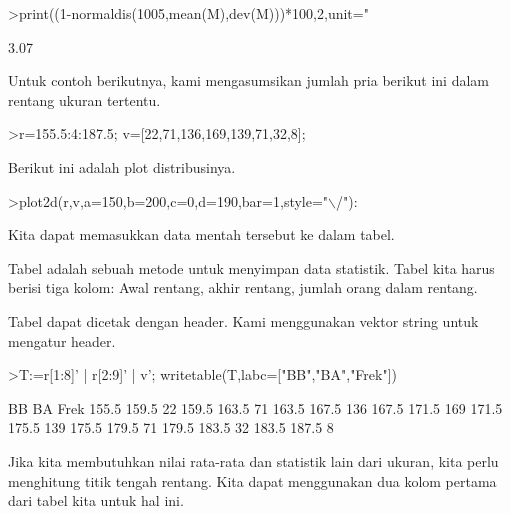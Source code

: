 \documentclass[a4paper,10pt]{article}
\begin{document}
\begin{eulernotebook}
\begin{eulercomment}
\begin{eulercomment}
\begin{eulercomment}
\begin{eulercomment}
\begin{eulercomment}
\begin{eulercomment}
\begin{eulercomment}
\begin{eulercomment}
\begin{eulercomment}
\begin{eulercomment}
\begin{eulercomment}
\begin{eulercomment}
\begin{eulercomment}
\begin{eulercomment}
\begin{eulercomment}
\begin{eulercomment}
\begin{eulercomment}
\begin{eulercomment}
\begin{eulercomment}
\end{eulercomment}
\begin{eulerprompt}
>print((1-normaldis(1005,mean(M),dev(M)))*100,2,unit=" %
\end{eulerprompt}
\begin{euleroutput}
        3.07 %
\end{euleroutput}
\begin{eulercomment}
Untuk contoh berikutnya, kami mengasumsikan jumlah pria berikut ini
dalam rentang ukuran tertentu.
\end{eulercomment}
\begin{eulerprompt}
>r=155.5:4:187.5; v=[22,71,136,169,139,71,32,8];
\end{eulerprompt}
\begin{eulercomment}
Berikut ini adalah plot distribusinya.
\end{eulercomment}
\begin{eulerprompt}
>plot2d(r,v,a=150,b=200,c=0,d=190,bar=1,style="\(\backslash\)/"):
\end{eulerprompt}
\begin{eulercomment}
Kita dapat memasukkan data mentah tersebut ke dalam tabel.

Tabel adalah sebuah metode untuk menyimpan data statistik. Tabel kita
harus berisi tiga kolom: Awal rentang, akhir rentang, jumlah orang
dalam rentang.

Tabel dapat dicetak dengan header. Kami menggunakan vektor string
untuk mengatur header.
\end{eulercomment}
\begin{eulerprompt}
>T:=r[1:8]' | r[2:9]' | v'; writetable(T,labc=["BB","BA","Frek"])
\end{eulerprompt}
\begin{euleroutput}
          BB        BA      Frek
       155.5     159.5        22
       159.5     163.5        71
       163.5     167.5       136
       167.5     171.5       169
       171.5     175.5       139
       175.5     179.5        71
       179.5     183.5        32
       183.5     187.5         8
\end{euleroutput}
\begin{eulercomment}
Jika kita membutuhkan nilai rata-rata dan statistik lain dari ukuran,
kita perlu menghitung titik tengah rentang. Kita dapat menggunakan dua
kolom pertama dari tabel kita untuk hal ini.


\end{eulercomment}
\end{eulercomment}
\end{eulercomment}
\end{eulercomment}
\end{eulercomment}
\end{eulercomment}
\end{eulercomment}
\end{eulercomment}
\end{eulercomment}
\end{eulercomment}
\end{eulercomment}
\end{eulercomment}
\end{eulercomment}
\end{eulercomment}
\end{eulercomment}
\end{eulercomment}
\end{eulercomment}
\end{eulercomment}
\end{eulercomment}
\end{eulernotebook}
\end{document}
